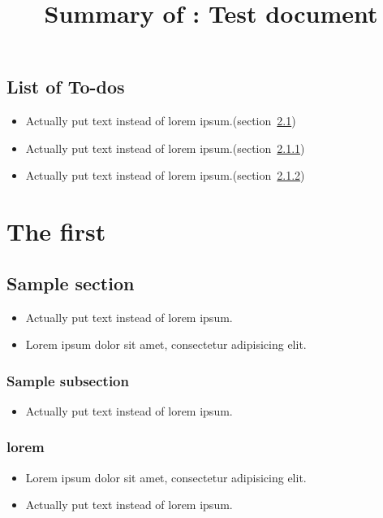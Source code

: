 \title{Summary of : Test document}
\maketitle

\section{List of To-dos}
    \begin{itemize}[noitemsep]
        \item {\color{red}Actually put text instead of lorem ipsum.}(section~\ref{autosec:2})
        \item {\color{red}Actually put text instead of lorem ipsum.}(section~\ref{autosec:3})
        \item {\color{red}Actually put text instead of lorem ipsum.}(section~\ref{autosec:4})
    \end{itemize}

\chapter{The first}  %
\label{autosec:1}

\section{Sample section}  %
\label{autosec:2}
    \begin{itemize}[noitemsep]
        \item {\color{red}Actually put text instead of lorem ipsum.}  %
        \item Lorem ipsum dolor sit amet, consectetur adipisicing elit.  %
    \end{itemize}
\subsection{Sample subsection}  %
\label{autosec:3}
    \begin{itemize}[noitemsep]
        \item {\color{red}Actually put text instead of lorem ipsum.}  %
    \end{itemize}
\subsection{lorem}  %
\label{autosec:4}
    \begin{itemize}[noitemsep]
        \item Lorem ipsum dolor sit amet, consectetur adipisicing elit.  %
        \item {\color{red}Actually put text instead of lorem ipsum.}  %
    \end{itemize}
